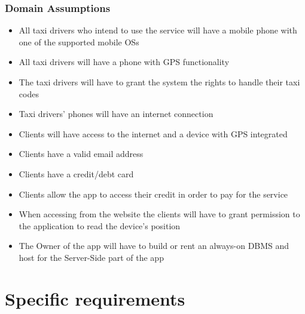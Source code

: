 \documentclass{article}
\begin{document}
\subsubsection{Domain Assumptions}
\begin{itemize}
	\item All taxi drivers who intend to use the service will have a mobile phone with one of the supported mobile OSs
	\item All taxi drivers will have a phone with GPS functionality
	\item The taxi drivers will have to grant the system the rights to handle their taxi codes
	\item Taxi drivers' phones will have an internet connection
	\item Clients will have access to the internet and a device with GPS integrated 
	\item Clients have a valid email address
	\item Clients have a credit/debt card 
	\item Clients allow the app to access their credit in order to pay for the service
	\item When accessing from the website the clients will have to grant permission to the application to read the device's position
	\item The Owner of the app will have to build or rent an always-on DBMS and host for the Server-Side part of the app
\end{itemize}
\clearpage
\section{Specific requirements}
\end{document}
